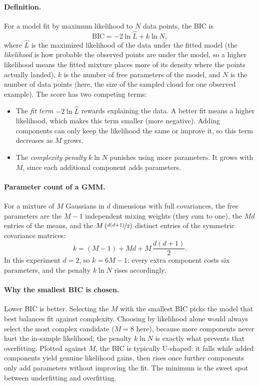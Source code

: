 \documentclass[11pt, letterpaper]{article}
\begin{document}
\paragraph{Definition.} For a model fit by maximum likelihood to $N$ data points, the BIC is
\begin{equation}\label{eq:bic}
    \mathrm{BIC} = -2\ln\hat{L} + k\ln N,
\end{equation}
where $\hat{L}$ is the maximized likelihood of the data under the fitted model (the \emph{likelihood} is how probable the observed points are under the model, so a higher likelihood means the fitted mixture places more of its density where the points actually landed), $k$ is the number of free parameters of the model, and $N$ is the number of data points (here, the size of the sampled cloud for one observed example). The score has two competing terms:
\begin{itemize}[leftmargin=2em]
    \item The \emph{fit term} $-2\ln\hat{L}$ rewards explaining the data. A better fit means a higher likelihood, which makes this term smaller (more negative). Adding components can only keep the likelihood the same or improve it, so this term decreases as $M$ grows.
    \item The \emph{complexity penalty} $k\ln N$ punishes using more parameters. It grows with $M$, since each additional component adds parameters.
\end{itemize}

\paragraph{Parameter count of a GMM.} For a mixture of $M$ Gaussians in $d$ dimensions with full covariances, the free parameters are the $M-1$ independent mixing weights (they sum to one), the $Md$ entries of the means, and the $M\left(\nicefrac{d(d+1)}{2}\right)$ distinct entries of the symmetric covariance matrices:
\begin{equation}\label{eq:gmm_param_count}
    k = (M-1) + Md + M\,\frac{d(d+1)}{2}.
\end{equation}
In this experiment $d = 2$, so $k = 6M - 1$: every extra component costs six parameters, and the penalty $k\ln N$ rises accordingly.

\paragraph{Why the smallest BIC is chosen.} Lower BIC is better. Selecting the $M$ with the smallest BIC picks the model that best balances fit against complexity. Choosing by likelihood alone would always select the most complex candidate ($M = 8$ here), because more components never hurt the in-sample likelihood; the penalty $k\ln N$ is exactly what prevents that overfitting. Plotted against $M$, the BIC is typically U-shaped: it falls while added components yield genuine likelihood gains, then rises once further components only add parameters without improving the fit. The minimum is the sweet spot between underfitting and overfitting.
\end{document}

